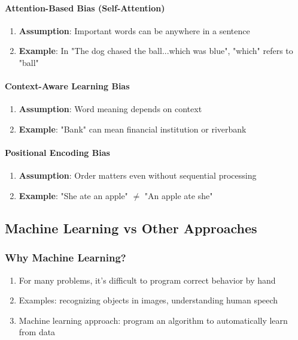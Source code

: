 \paragraph{Attention-Based Bias (Self-Attention)}
\label{para:attention-bias}

\begin{enumerate}
\item \textbf{Assumption}: Important words can be anywhere in a sentence
\item \textbf{Example}: In "The dog chased the ball...which was blue", "which" refers to "ball"
\end{enumerate}

\paragraph{Context-Aware Learning Bias}
\label{para:context-aware-bias}

\begin{enumerate}
\item \textbf{Assumption}: Word meaning depends on context
\item \textbf{Example}: "Bank" can mean financial institution or riverbank
\end{enumerate}

\paragraph{Positional Encoding Bias}
\label{para:positional-encoding}

\begin{enumerate}
\item \textbf{Assumption}: Order matters even without sequential processing
\item \textbf{Example}: "She ate an apple" $\neq$ "An apple ate she"
\end{enumerate}

\subsection{Machine Learning vs Other Approaches}
\label{subsec:ml-vs-other}

\subsubsection{Why Machine Learning?}
\label{subsubsec:why-ml}

\begin{enumerate}
\item For many problems, it's difficult to program correct behavior by hand
\item Examples: recognizing objects in images, understanding human speech
\item Machine learning approach: program an algorithm to automatically learn from data
\end{enumerate}

